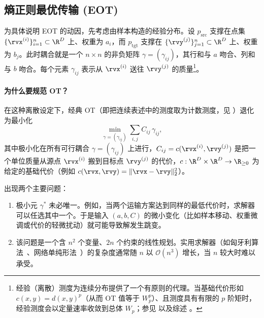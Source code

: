 \subsection{熵正则最优传输 (EOT)}

为具体说明 EOT 的动因，先考虑由样本构造的经验分布。设 $p_{\mathrm{src}}$ 支撑在点集 $\{\rvx^{(i)}\}_{i=1}^n \subset \R^D$ 上、权重为 $a_i$，而 $p_{\mathrm{tgt}}$ 支撑在 $\{\rvy^{(j)}\}_{j=1}^n \subset \R^D$ 上、权重为 $b_j$。此时耦合就是一个 $n\times n$ 的非负矩阵 $\gamma=(\gamma_{ij})$，其行和与 $a$ 吻合、列和与 $b$ 吻合。每个元素 $\gamma_{ij}$ 表示从 $\rvx^{(i)}$ 送往 $\rvy^{(j)}$ 的质量\footnote{经验（离散）测度为连续分布提供了一个有原则的代理。当基础代价形如 $c(x,y)=d(x,y)^p$（从而 OT 值等于 $W_p^p$）、且测度具有有限的 $p$ 阶矩时，经验测度会以定量速率收敛到总体 $W_p$；参见 \citet{fournier2015rate} 以及综述 \citet{peyre2019computational}。}。

\paragraph{为什么要规范 OT？}
在这种离散设定下，经典 OT（即把连续表述中的测度取为计数测度，见 ）退化为最小化
\[
\min_{\gamma=(\gamma_{ij})}\sum_{i,j} C_{ij}\,\gamma_{ij},
\]
其中极小化在所有可行耦合 $\gamma=(\gamma_{ij})$ 上进行，$C_{ij} = c(\rvx^{(i)},\rvy^{(j)})$ 是把一个单位质量从源点 $\rvx^{(i)}$ 搬到目标点 $\rvy^{(j)}$ 的代价，$c:\R^D\times\R^D\to\R_{\ge 0}$ 为给定的基础代价（例如 $c(\rvx,\rvy)=\|\rvx-\rvy\|_2^2$）。

出现两个主要问题：
\begin{enumerate}
    \item {} 极小元 $\gamma^*$ 未必唯一。例如，当两个运输方案达到同样的最低代价时，求解器可以任选其中一个。于是输入 $(a,b,C)$ 的微小变化（比如样本移动、权重微调或代价的轻微扰动）就可能导致解发生跳变。
    \item {} 该问题是一个含 $n^2$ 个变量、$2n$ 个约束的线性规划。实用求解器（如匈牙利算法~\citep{kuhn1955hungarian,munkres1957algorithms}、网络单纯形法~\citep{peyre2019computational}）的复杂度通常随 $n$ 以 $\mathcal{O}(n^3)$ 增长，当 $n$ 较大时难以承受。
\end{enumerate}

